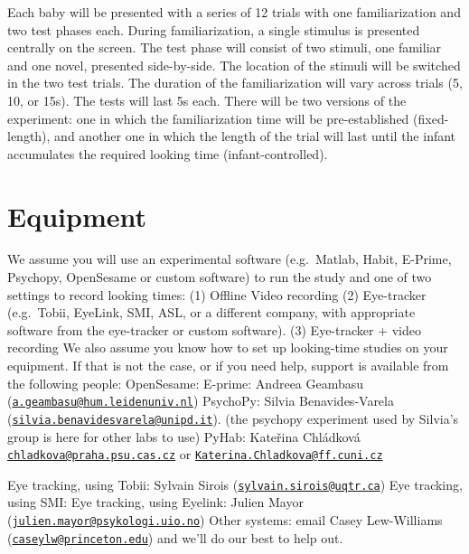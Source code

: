 \documentclass[
]{book}
\begin{document}
Each baby will be presented with a series of 12 trials with one familiarization and two test phases each. During familiarization, a single stimulus is presented centrally on the screen. The test phase will consist of two stimuli, one familiar and one novel, presented side-by-side. The location of the stimuli will be switched in the two test trials. The duration of the familiarization will vary across trials (5, 10, or 15s). The tests will last 5s each. There will be two versions of the experiment: one in which the familiarization time will be pre-established (fixed-length), and another one in which the length of the trial will last until the infant accumulates the required looking time (infant-controlled).

\hypertarget{equipment}{%
\section{Equipment}\label{equipment}}

We assume you will use an experimental software (e.g.~Matlab, Habit, E-Prime, Psychopy, OpenSesame or custom software) to run the study and one of two settings to record looking times:
(1) Offline Video recording
(2) Eye-tracker (e.g.~Tobii, EyeLink, SMI, ASL, or a different company, with appropriate software from the eye-tracker or custom software).
(3) Eye-tracker + video recording
We also assume you know how to set up looking-time studies on your equipment. If that is not the case, or if you need help, support is available from the following people:
OpenSesame:
E-prime: Andreea Geambasu (\href{mailto:a.geambasu@hum.leidenuniv.nl}{\nolinkurl{a.geambasu@hum.leidenuniv.nl}})
PsychoPy: Silvia Benavides-Varela (\href{mailto:silvia.benavidesvarela@unipd.it}{\nolinkurl{silvia.benavidesvarela@unipd.it}}). (the psychopy experiment used by Silvia's group is here for other labs to use)
PyHab: Kateřina Chládková \href{mailto:chladkova@praha.psu.cas.cz}{\nolinkurl{chladkova@praha.psu.cas.cz}} or \href{mailto:Katerina.Chladkova@ff.cuni.cz}{\nolinkurl{Katerina.Chladkova@ff.cuni.cz}}

Eye tracking, using Tobii: Sylvain Sirois (\href{mailto:sylvain.sirois@uqtr.ca}{\nolinkurl{sylvain.sirois@uqtr.ca}})
Eye tracking, using SMI:
Eye tracking, using Eyelink: Julien Mayor (\href{mailto:julien.mayor@psykologi.uio.no}{\nolinkurl{julien.mayor@psykologi.uio.no}})
Other systems: email Casey Lew-Williams (\href{mailto:caseylw@princeton.edu}{\nolinkurl{caseylw@princeton.edu}}) and we'll do our best to help out.
\end{document}
